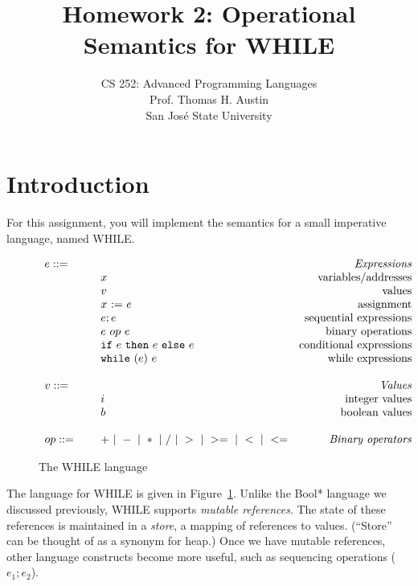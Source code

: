 \documentclass{article}
\title{Homework 2: Operational Semantics for WHILE}
\author{
  CS 252: Advanced Programming Languages \\
  Prof. Thomas H. Austin \\
  San Jos\'{e} State University \\
  }
\date{}
\begin{document}
\maketitle

\section{Introduction}

For this assignment,
you will implement the semantics for a small imperative language, named WHILE.

\newcommand{\mydefhead}[2]{\multicolumn{2}{l}{{#1}}&\mbox{\emph{#2}}\\}
\newcommand{\mydefcase}[2]{\qquad\qquad& #1 &\mbox{#2}\\}

\newcommand{\assign}[2]{#1~{:=}~#2}
\newcommand{\ife}[3]{\mbox{\tt if}~{#1}~\mbox{\tt then}~{#2}~\mbox{\tt else}~{#3}}
\newcommand{\whilee}[2]{\mbox{\tt while}~(#1)~#2}
\newcommand{\true}{\mbox{\tt true}}
\newcommand{\false}{\mbox{\tt false}}

\begin{figure}\label{fig:lang}
\caption{The WHILE language}
\[
\begin{array}{llr}
  \mydefhead{e ::=\qquad\qquad\qquad\qquad}{Expressions}
  \mydefcase{x}{variables/addresses}
  \mydefcase{v}{values}
  \mydefcase{\assign x e}{assignment}
  \mydefcase{e; e}{sequential expressions}
  \mydefcase{e ~op~ e}{binary operations}
  \mydefcase{\ife e e e}{conditional expressions}
  \mydefcase{\whilee e e}{while expressions}
  \\
  \mydefhead{v ::=\qquad\qquad\qquad\qquad}{Values}
  \mydefcase{i}{integer values}
  \mydefcase{b}{boolean values}
  \\
  op ::= & + ~|~ - ~|~ * ~|~ / ~|~ > ~|~ >= ~|~ < ~|~ <=  & \mbox{\emph{Binary operators}} \\
\end{array}
\]
\end{figure}

The language for WHILE is given in Figure~\ref{fig:lang}.
Unlike the Bool* language we discussed previously,
WHILE supports \emph{mutable references}.
The state of these references is maintained in a \emph{store},
a mapping of references to values.
(``Store'' can be thought of as a synonym for heap.)
Once we have mutable references, other language constructs become more useful,
such as sequencing operations ($e_1;e_2$).
\end{document}
